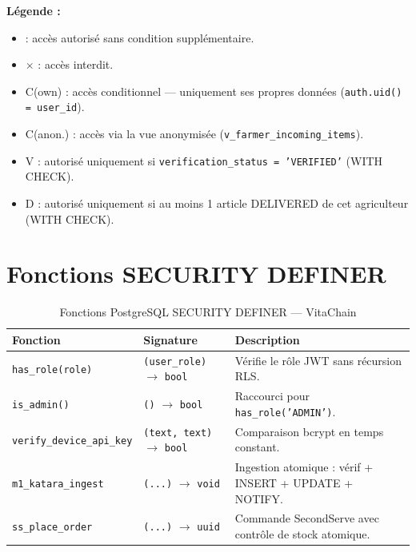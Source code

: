 \documentclass[12pt,a4paper]{report}
\newcommand{\code}[1]{\texttt{\small #1}}
\begin{document}
\vspace{6pt}
\noindent
\textbf{Légende :}
\begin{itemize}
  \item \checkmark{} : accès autorisé sans condition supplémentaire.
  \item $\times$ : accès interdit.
  \item C(own) : accès conditionnel --- uniquement ses propres données
        (\code{auth.uid() = user\_id}).
  \item C(anon.) : accès via la vue anonymisée
        (\code{v\_farmer\_incoming\_items}).
  \item V : autorisé uniquement si \code{verification\_status = 'VERIFIED'}
        (WITH CHECK).
  \item D : autorisé uniquement si au moins 1 article DELIVERED de cet
        agriculteur (WITH CHECK).
\end{itemize}

\section{Fonctions SECURITY DEFINER}

\begin{table}[H]
  \centering
  \caption{Fonctions PostgreSQL SECURITY DEFINER --- VitaChain}
  \label{tab:secdef}
  \small
  \begin{tabularx}{\linewidth}{llX}
    \toprule
    \textbf{Fonction} & \textbf{Signature} & \textbf{Description} \\
    \midrule
    \code{has\_role(role)}
      & \code{(user\_role)} $\rightarrow$ \code{bool}
      & Vérifie le rôle JWT sans récursion RLS. \\
    \code{is\_admin()}
      & \code{()} $\rightarrow$ \code{bool}
      & Raccourci pour \code{has\_role('ADMIN')}. \\
    \code{verify\_device\_api\_key}
      & \code{(text, text)} $\rightarrow$ \code{bool}
      & Comparaison bcrypt en temps constant. \\
    \code{m1\_katara\_ingest}
      & \code{(...)} $\rightarrow$ \code{void}
      & Ingestion atomique : vérif + INSERT + UPDATE + NOTIFY. \\
    \code{ss\_place\_order}
      & \code{(...)} $\rightarrow$ \code{uuid}
      & Commande SecondServe avec contrôle de stock atomique. \\
    \bottomrule
  \end{tabularx}
\end{table}
\end{document}
